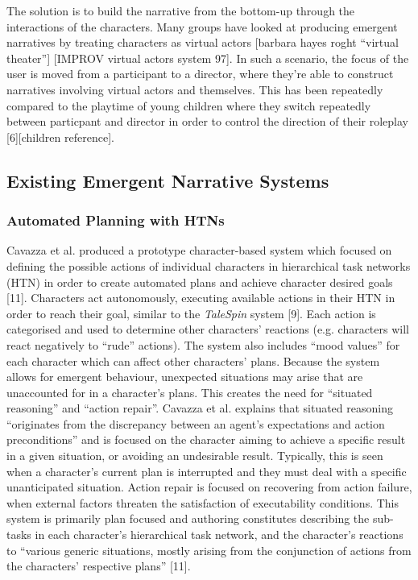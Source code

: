 \documentclass{sig-alternate-05-2015}
\begin{document}
The solution is to build the narrative from the bottom-up through the interactions of the characters. Many groups have looked at producing emergent narratives by treating characters as virtual actors [barbara hayes roght ``virtual theater''] [IMPROV virtual actors system 97]. In such a scenario, the focus of the user is moved from a participant to a director, where they're able to construct narratives involving virtual actors and themselves. This has been repeatedly compared to the playtime of young children where they switch repeatedly between particpant and director in order to control the direction of their roleplay [6][children reference]. 

\subsection{Existing Emergent Narrative Systems}

\subsubsection{Automated Planning with HTNs}

Cavazza et al. produced a prototype character-based system which focused on defining the possible actions of individual characters in hierarchical task networks (HTN) in order to create automated plans and achieve character desired goals [11]. Characters act autonomously, executing available actions in their HTN in order to reach their goal, similar to the \textit{TaleSpin} system [9].  Each action is categorised and used to determine other characters' reactions (e.g. characters will react negatively to ``rude'' actions). The system also includes ``mood values'' for each character which can affect other characters' plans. Because the system allows for emergent behaviour, unexpected situations may arise that are unaccounted for in a character's plans. This creates the need for ``situated reasoning'' and ``action repair''. Cavazza et al. explains that situated reasoning ``originates from the discrepancy between an agent's expectations and action preconditions'' and is focused on the character aiming to achieve a specific result in a given situation, or avoiding an undesirable result. Typically, this is seen when a character's current plan is interrupted and they must deal with a specific unanticipated situation. Action repair is focused on recovering from action failure, when external factors threaten the satisfaction of executability conditions. This system is primarily plan focused and authoring constitutes describing the sub-tasks in each character's hierarchical task network, and the character's reactions to ``various generic situations, mostly arising
from the conjunction of actions from the characters'
respective plans'' [11].\\ 
\end{document}
